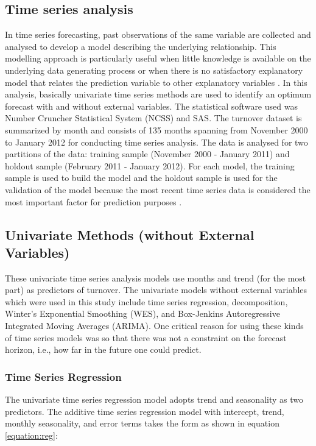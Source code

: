 \subsection{Time series analysis}
In time series forecasting, past observations of the same variable are collected and analysed to develop a model describing the underlying relationship. This modelling approach is particularly useful when little knowledge is available on the underlying data generating process or when there is no satisfactory explanatory model that relates the prediction variable to other explanatory variables \citep{zhang2003}. In this analysis, basically univariate time series methods are used to identify an optimum forecast with and without external variables. The statistical software used was Number Cruncher Statistical System (NCSS) and SAS. The turnover dataset is summarized by month and consists of 135 months spanning from November 2000 to January 2012 for conducting time series analysis. The data is analysed for two partitions of the data: training sample (November 2000 - January 2011) and holdout sample (February 2011 - January 2012). For each model, the training sample is used to build the model and the holdout sample is used for the validation of the model because the most recent time series data is considered the most important factor for prediction purposes \citep{bergmeir2012}. 
\subsection{Univariate Methods (without External Variables)}
These univariate time series analysis models use months and trend (for the most part) as predictors of turnover. The univariate models without external variables which were used in this study include time series regression, decomposition, Winter’s Exponential Smoothing (WES), and Box-Jenkins Autoregressive Integrated Moving Averages (ARIMA). One critical reason for using these kinds of time series models was so that there was not a constraint on the forecast horizon, i.e., how far in the future one could predict.

\subsubsection{Time Series Regression}
The univariate time series regression model adopts trend and seasonality as two predictors. The additive time series regression model with intercept, trend, monthly seasonality, and error terms takes the form as shown in equation \ref{equation:reg}:

